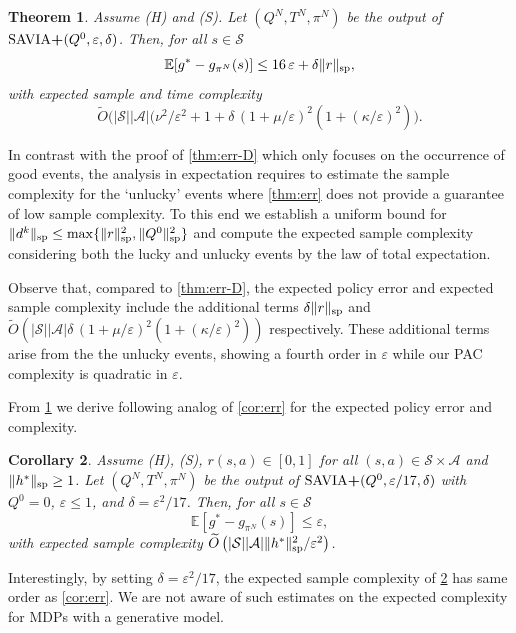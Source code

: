 \documentclass{article}
\newcommand{\cA}{\mathcal{A}}
\newcommand{\cS}{\mathcal{S}}
\newcommand{\expec}{\mathbb{E}}
\renewcommand{\sp}[1]{\|{#1}\|_\text{\rm sp}}
\newcommand{\R}{r}
\theoremstyle{plain}
\newtheorem{theorem}{Theorem}[section]
\newtheorem{corollary}[theorem]{Corollary}
\theoremstyle{definition}
\theoremstyle{remark}
\begin{document}
\begin{theorem}\label{thm:E-err-D}
Assume \mbox{\sc (H)} and \mbox{\sc (S)}. Let $(Q^N,T^N,\pi^N)$ be the output of $\mbox{\rm SAVIA\textbf{+}}(Q^0,\varepsilon,\delta)$. Then, for all $s\in\cS$
$$\expec[g^*-g_{\pi^N}(s)] \leq 16\,\varepsilon +\delta \sp{r},$$
    with expected sample and time complexity
 $$\widetilde{O}\big(|\cS||\cA|\mbox{$(\nu^{2}/{\varepsilon^{2}}+1 +
    \delta\, (1+\mu/\varepsilon)^2(1+(\kappa/\varepsilon)^2)$}\big).$$
\end{theorem}

In contrast with the proof of \cref{thm:err-D} which only focuses on the occurrence of good events, the analysis in expectation requires to estimate the sample complexity for the `unlucky' events where \cref{thm:err} does not provide a guarantee of low sample complexity. To this end we establish a uniform bound for $\sp{d^k} \le \max\{\sp{\R}^2, \sp{Q^0}^2\}$ and compute the expected sample complexity considering both the lucky and unlucky events by the law of total expectation. 

Observe that, compared to \cref{thm:err-D}, the expected policy error and expected sample complexity include  the additional terms $\delta \sp{r}$ and $\widetilde{O}(\mbox{$|\cS||\cA| \delta\, (1+\mu/\varepsilon)^2(1+(\kappa/\varepsilon)^2) $})$ respectively. These additional terms arise from the the unlucky events, showing a fourth order in $\varepsilon$ while our PAC complexity is quadratic in $\varepsilon$.   

From \cref{thm:E-err-D} we derive following analog of \cref{cor:err} 
for the expected policy error and complexity. 
\begin{corollary}\label{cor:expected}
   Assume \mbox{\sc (H)}, \mbox{\sc (S)},  $r(s,a) \in[0,1]$ for all $(s,a)\in \cS\times \cA$ and $\sp{h^{*}}\ge 1$. Let $(Q^N,T^N,\pi^N)$ be the output of $\mbox{\rm SAVIA$\textbf{+}$}(Q^0,\varepsilon/17,\delta)$ with  $Q^0=0$,  $\varepsilon\leq 1$, and $\delta=\varepsilon^2/17$. Then,  for all $s\in\cS$
  $$\expec[g^*-g_{\pi^N}(s)] \leq \varepsilon,$$
   with
   expected sample complexity  $\widetilde{O}\left({|\cS||\cA|\sp{h^*}^{2}}/{\varepsilon^{2}}\right)$.
\end{corollary}

Interestingly, by setting $\delta=\varepsilon^2/17$, the expected sample complexity of \cref{cor:expected} has same order as \cref{cor:err}. 
We are not aware of such estimates on the expected complexity for MDPs with a generative model. 
\end{document}

